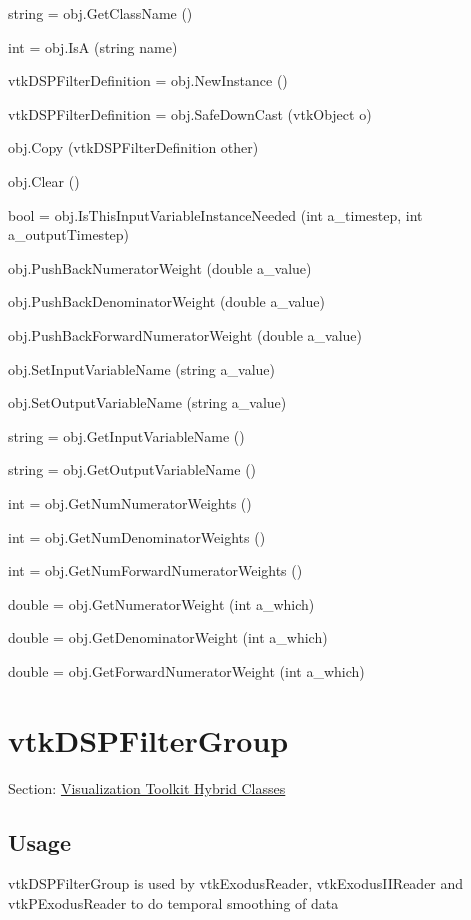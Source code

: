 \begin{DoxyItemize}
\item {\ttfamily string = obj.\-Get\-Class\-Name ()}  
\item {\ttfamily int = obj.\-Is\-A (string name)}  
\item {\ttfamily vtk\-D\-S\-P\-Filter\-Definition = obj.\-New\-Instance ()}  
\item {\ttfamily vtk\-D\-S\-P\-Filter\-Definition = obj.\-Safe\-Down\-Cast (vtk\-Object o)}  
\item {\ttfamily obj.\-Copy (vtk\-D\-S\-P\-Filter\-Definition other)}  
\item {\ttfamily obj.\-Clear ()}  
\item {\ttfamily bool = obj.\-Is\-This\-Input\-Variable\-Instance\-Needed (int a\-\_\-timestep, int a\-\_\-output\-Timestep)}  
\item {\ttfamily obj.\-Push\-Back\-Numerator\-Weight (double a\-\_\-value)}  
\item {\ttfamily obj.\-Push\-Back\-Denominator\-Weight (double a\-\_\-value)}  
\item {\ttfamily obj.\-Push\-Back\-Forward\-Numerator\-Weight (double a\-\_\-value)}  
\item {\ttfamily obj.\-Set\-Input\-Variable\-Name (string a\-\_\-value)}  
\item {\ttfamily obj.\-Set\-Output\-Variable\-Name (string a\-\_\-value)}  
\item {\ttfamily string = obj.\-Get\-Input\-Variable\-Name ()}  
\item {\ttfamily string = obj.\-Get\-Output\-Variable\-Name ()}  
\item {\ttfamily int = obj.\-Get\-Num\-Numerator\-Weights ()}  
\item {\ttfamily int = obj.\-Get\-Num\-Denominator\-Weights ()}  
\item {\ttfamily int = obj.\-Get\-Num\-Forward\-Numerator\-Weights ()}  
\item {\ttfamily double = obj.\-Get\-Numerator\-Weight (int a\-\_\-which)}  
\item {\ttfamily double = obj.\-Get\-Denominator\-Weight (int a\-\_\-which)}  
\item {\ttfamily double = obj.\-Get\-Forward\-Numerator\-Weight (int a\-\_\-which)}  
\end{DoxyItemize}\hypertarget{vtkhybrid_vtkdspfiltergroup}{}\section{vtk\-D\-S\-P\-Filter\-Group}\label{vtkhybrid_vtkdspfiltergroup}
Section\-: \hyperlink{sec_vtkhybrid}{Visualization Toolkit Hybrid Classes} \hypertarget{vtkwidgets_vtkxyplotwidget_Usage}{}\subsection{Usage}\label{vtkwidgets_vtkxyplotwidget_Usage}
vtk\-D\-S\-P\-Filter\-Group is used by vtk\-Exodus\-Reader, vtk\-Exodus\-I\-I\-Reader and vtk\-P\-Exodus\-Reader to do temporal smoothing of data

